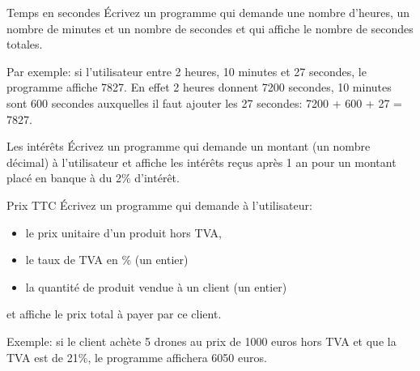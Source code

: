 \documentclass[a4paper,11pt]{article}
\begin{document}
	\begin{Exercice}{Temps en secondes} 
		\'Ecrivez un programme qui demande 
		une nombre d'heures, un nombre de minutes et un nombre de secondes
		et qui affiche le nombre de secondes totales.
		
		Par exemple: si l'utilisateur entre 2 heures, 10 minutes et 27 secondes, le 
		programme affiche
		7827. En effet 2 heures donnent 7200 secondes, 10 minutes sont 600 secondes 
		auxquelles il faut ajouter les 27 secondes: 7200 + 600 + 27 = 7827. 
	\end{Exercice}


	\begin{Exercice}{Les intérêts}
		\'Ecrivez un programme qui demande un montant (un nombre décimal)
		à l'utilisateur et affiche les intérêts reçus après 1 an pour un montant placé 
		en banque à du 2\% d'intérêt.
	\end{Exercice}

	\begin{Exercice}{Prix TTC}
		\'Ecrivez un programme qui demande à l'utilisateur:
		\begin{itemize}
			\item le prix unitaire d’un produit hors TVA, 
			\item le taux de TVA en \% (un entier) 
			\item la quantité de produit vendue à un client (un entier)
		\end{itemize}
		et affiche le prix total à payer par ce client.
		
		Exemple: si le client achète 5 drones au prix de 1000 euros hors TVA et que la
		TVA est de 21\%, le programme affichera 6050 euros.
	\end{Exercice}
\end{document}
